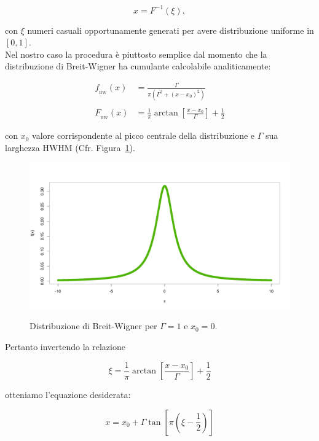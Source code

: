 $$x = F^{-1}(\xi),$$
	
\noindent con $\xi$ numeri casuali opportunamente generati per avere distribuzione uniforme in $[0,1]$.\\

\noindent Nel nostro caso la procedura è piuttosto semplice dal momento che la distribuzione di Breit-Wigner ha cumulante calcolabile analiticamente:

\begin{align*}
f_{_{\mathrm{BW}}}(x) &= \frac{\Gamma}{\pi(\Gamma^2 + (x-x_0)^2)} \\ \\
F_{_{\mathrm{BW}}}(x) &= \frac{1}{\pi}\arctan\left[\frac{x-x_0}{\Gamma}\right] + \frac{1}{2}
\end{align*}

\noindent con $x_0$ valore corrispondente al picco centrale della distribuzione e $\Gamma$ sua larghezza HWHM (Cfr. Figura~\ref{fig:Breit-Wigner}).\\

\begin{figure}
	\centering
	\caption{Distribuzione di Breit-Wigner per $\Gamma=1$ e $x_0=0$.}
	\includegraphics[width=.98\textwidth, trim={0 1cm 0 2.5cm},clip]{Immagini/Breit-Wigner.pdf}
	\label{fig:Breit-Wigner}
\end{figure}

\noindent Pertanto invertendo la relazione

$$ \xi = \frac{1}{\pi}\arctan\left[\frac{x-x_0}{\Gamma}\right] + \frac{1}{2}$$

\noindent otteniamo l'equazione desiderata:

$$\boxed{x = x_0 + \Gamma\tan\left[\pi\left(\xi-\frac{1}{2}\right)\right]}$$\\

